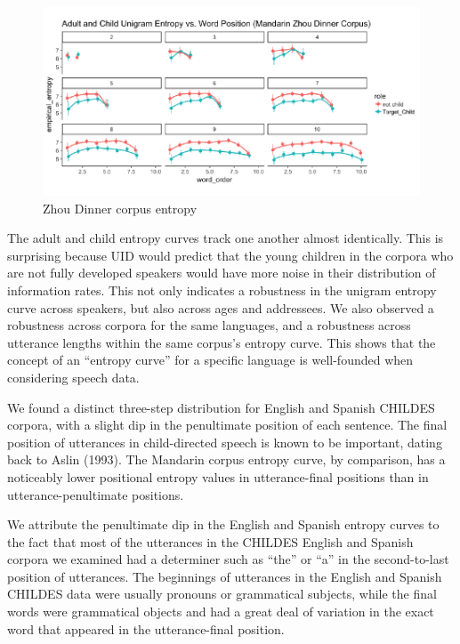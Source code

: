 \documentclass[10pt, letterpaper]{article}
\newenvironment{CodeChunk}{}{}
\begin{document}
\begin{CodeChunk}
\begin{figure}[h]

{\centering \includegraphics{figs/zhou_PE-1} 

}

\caption[Zhou Dinner corpus entropy]{Zhou Dinner corpus entropy}\label{fig:zhou_PE}
\end{figure}
\end{CodeChunk}

The adult and child entropy curves track one another almost identically.
This is surprising because UID would predict that the young children in
the corpora who are not fully developed speakers would have more noise
in their distribution of information rates. This not only indicates a
robustness in the unigram entropy curve across speakers, but also across
ages and addressees. We also observed a robustness across corpora for
the same languages, and a robustness across utterance lengths within the
same corpus's entropy curve. This shows that the concept of an ``entropy
curve'' for a specific language is well-founded when considering speech
data.

We found a distinct three-step distribution for English and Spanish
CHILDES corpora, with a slight dip in the penultimate position of each
sentence. The final position of utterances in child-directed speech is
known to be important, dating back to Aslin (1993). The Mandarin corpus
entropy curve, by comparison, has a noticeably lower positional entropy
values in utterance-final positions than in utterance-penultimate
positions.

We attribute the penultimate dip in the English and Spanish entropy
curves to the fact that most of the utterances in the CHILDES English
and Spanish corpora we examined had a determiner such as ``the'' or
``a'' in the second-to-last position of utterances. The beginnings of
utterances in the English and Spanish CHILDES data were usually pronouns
or grammatical subjects, while the final words were grammatical objects
and had a great deal of variation in the exact word that appeared in the
utterance-final position.
\end{document}
